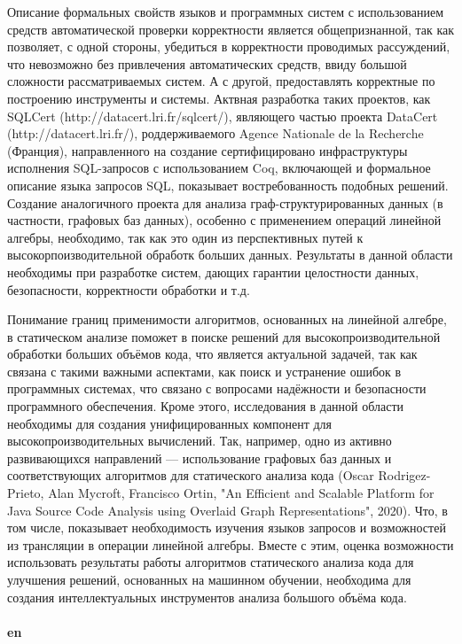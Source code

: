 \documentclass[12pt]{article}  %
\theoremstyle{remark}
\begin{document}
Описание формальных свойств языков и программных систем с использованием средств автоматической проверки корректности является общепризнанной, так как позволяет, с одной стороны, убедиться в корректности проводимых рассуждений, что невозможно без привлечения автоматических средств, ввиду большой сложности рассматриваемых систем. А с другой, предоставлять корректные по построению инструменты и системы. Актвная разработка таких проектов, как SQLCert (http://datacert.lri.fr/sqlcert/), являющего частью проекта DataCert (http://datacert.lri.fr/), роддерживаемого Agence Nationale de la Recherche (Франция), направленного на создание сертифицировано инфраструктуры исполнения SQL-запросов с использованием Coq, включающей и формальное описание языка запросов SQL, показывает востребованность подобных решений. Создание аналогичного проекта для анализа граф-структурированных данных (в частности, графовых баз данных), особенно с применением операций линейной алгебры, необходимо, так как это один из перспективных путей к высокорпоизводительной обработк больших данных. Результаты в данной области необходимы при разработке систем, дающих гарантии целостности данных, безопасности, корректности обработки и т.д.

Понимание границ применимости алгоритмов, основанных на линейной алгебре, в статическом анализе поможет в поиске решений для высокопроизводительной обработки больших объёмов кода, что является актуальной задачей, так как связана с такими важными аспектами, как поиск и устранение ошибок в программных системах, что связано с вопросами надёжности и безопасности программного обеспечения. Кроме этого, исследования в данной области необходимы для создания унифицированных компонент для высокопроизводительных вычислений. Так, например, одно из активно развивающихся направлений --- использование графовых баз данных и соответствующих алгоритмов для статического анализа кода (Oscar Rodrigez-Prieto, Alan Mycroft, Francisco Ortin, "An Efficient and Scalable Platform for Java Source Code Analysis using Overlaid Graph Representations", 2020). Что, в том числе, показывает необходимость изучения языков запросов и возможностей из трансляции в операции линейной алгебры.
Вместе с этим, оценка возможности использовать результаты работы алгоритмов статического анализа кода для улучшения решений, основанных на машинном обучении, необходима для создания интеллектуальных инструментов анализа большого объёма кода.
\\
\\
\textbf{en}\\
\end{document}
